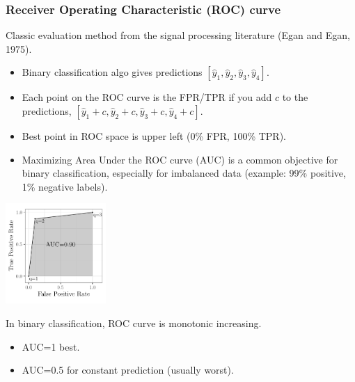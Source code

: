 \documentclass[t]{beamer}
\begin{document}
\begin{frame}
  \frametitle{Receiver Operating Characteristic (ROC) curve}
Classic evaluation method from the signal processing literature (Egan and
    Egan, 1975). 
  \begin{itemize}
  \item Binary classification algo gives predictions
    $[\hat y_1,\hat y_2,\hat y_3,\hat y_4]$.
  \item Each point on the ROC curve is the FPR/TPR if you add $c$ to
    the predictions, $[\hat y_1+c,\hat y_2+c,\hat y_3+c,\hat y_4+c]$.
  \item Best point in ROC space is upper left (0\% FPR, 100\% TPR).
  \item Maximizing Area Under the ROC curve (AUC) is a common
    objective for binary classification, especially for imbalanced
    data (example: 99\% positive, 1\% negative labels).
  \end{itemize} 
  
  \parbox{1.5in}{
\includegraphics[width=1.5in]{figure-more-than-one-less-auc}
}
\parbox{2.5in}{
In binary classification, ROC curve is monotonic increasing.
  \begin{itemize}
  \item AUC=1 best.
  \item AUC=0.5 for constant prediction (usually worst).
  \end{itemize}
}

\end{frame}
\end{document}
